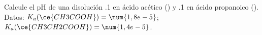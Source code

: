 Calcule el pH de una disolución \SI{,1}{\Molar} en ácido acético () y \SI{,1}{\Molar} en ácido propanoico (). Datos: $K_a(\ce{CH3COOH}) = \num{1,8e-5}$; $K_a(\ce{CH3CH2COOH}) = \num{1,4e-5}$.
